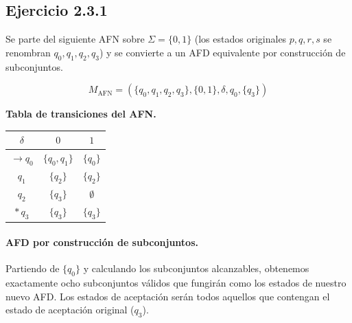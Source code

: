 \documentclass[12pt]{article}
\begin{document}
\subsection{Ejercicio 2.3.1}

Se parte del siguiente AFN sobre $\Sigma=\{0,1\}$ (los estados originales $p,q,r,s$ se renombran $q_0,q_1,q_2,q_3$) y se convierte a un AFD equivalente por construcción de subconjuntos.

\[
M_{\text{AFN}}=(\{q_0,q_1,q_2,q_3\},\{0,1\},\delta,q_0,\{q_3\})
\]

\begin{center}
\end{center}

\noindent\textbf{Tabla de transiciones del AFN.}
\begin{center}
\begin{tabular}{c|cc}
$\delta$ & $0$ & $1$\\ \hline
$\rightarrow q_0$ & $\{q_0,q_1\}$ & $\{q_0\}$\\
$q_1$ & $\{q_2\}$ & $\{q_2\}$\\
$q_2$ & $\{q_3\}$ & $\emptyset$\\
$*\,q_3$ & $\{q_3\}$ & $\{q_3\}$\\
\end{tabular}
\end{center}

\vspace{0.5cm}

\paragraph{AFD por construcción de subconjuntos.} Partiendo de $\{q_0\}$ y calculando los subconjuntos alcanzables, obtenemos exactamente ocho subconjuntos válidos que fungirán como los estados de nuestro nuevo AFD. Los estados de aceptación serán todos aquellos que contengan el estado de aceptación original ($q_3$).
\end{document}
